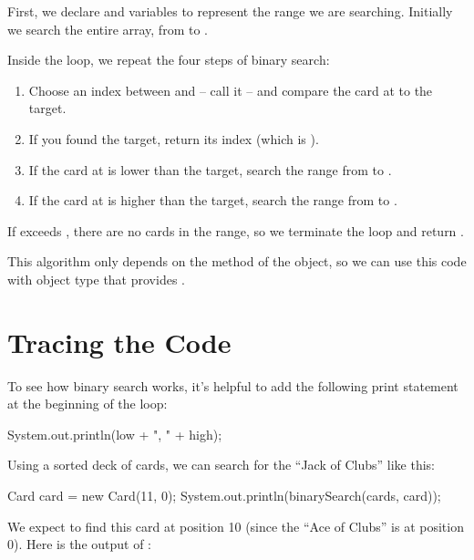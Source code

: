 First, we declare  and  variables to represent the range we are searching.
Initially we search the entire array, from  to .

Inside the  loop, we repeat the four steps of binary search:

\begin{enumerate}

\item Choose an index between  and  -- call it  -- and compare the card at  to the target.

\item If you found the target, return its index (which is ).

\item If the card at  is lower than the target, search the range from  to .

\item If the card at  is higher than the target, search the range from  to .

\end{enumerate}

If  exceeds , there are no cards in the range, so we terminate the loop and return .

This algorithm only depends on the  method of the object, so we can use this code with object type that provides .


\section{Tracing the Code}


To see how binary search works, it's helpful to add the following print statement at the beginning of the loop:

\begin{code}
System.out.println(low + ", " + high);
\end{code}

Using a sorted deck of cards, we can search for the ``Jack of Clubs'' like this:

\begin{code}
Card card = new Card(11, 0);
System.out.println(binarySearch(cards, card));
\end{code}

We expect to find this card at position 10 (since the ``Ace of Clubs'' is at position 0).
Here is the output of :

